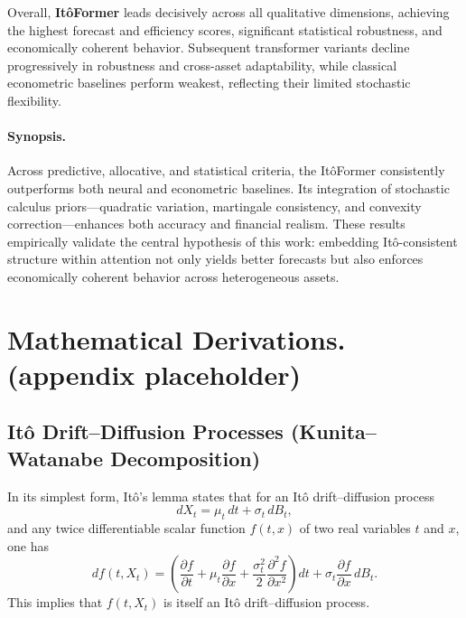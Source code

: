 \documentclass[10pt,twocolumn]{article}
\begin{document}
Overall, \textbf{ItôFormer} leads decisively across all qualitative dimensions, achieving the highest forecast and efficiency scores, significant statistical robustness, and economically coherent behavior. Subsequent transformer variants decline progressively in robustness and cross-asset adaptability, while classical econometric baselines perform weakest, reflecting their limited stochastic flexibility.

\paragraph{Synopsis.}

Across predictive, allocative, and statistical criteria, the ItôFormer consistently outperforms both neural and econometric baselines.  
Its integration of stochastic calculus priors---quadratic variation, martingale consistency, and convexity correction---enhances both accuracy and financial realism.  
These results empirically validate the central hypothesis of this work:  
embedding Itô-consistent structure within attention not only yields better forecasts but also enforces economically coherent behavior across heterogeneous assets.



















\clearpage

\section*{Mathematical Derivations. (appendix placeholder)}
\subsection*{It\^o Drift--Diffusion Processes (Kunita--Watanabe Decomposition)}

In its simplest form, It\^o's lemma states that for an It\^o drift--diffusion process
\begin{equation}
dX_t = \mu_t\,dt + \sigma_t\,dB_t,
\end{equation}
and any twice differentiable scalar function $f(t, x)$ of two real variables $t$ and $x$, one has
\begin{equation}
df(t, X_t)
= \left(
\frac{\partial f}{\partial t}
+ \mu_t \frac{\partial f}{\partial x}
+ \frac{\sigma_t^2}{2} \frac{\partial^2 f}{\partial x^2}
\right) dt
+ \sigma_t \frac{\partial f}{\partial x}\, dB_t.
\end{equation}
This implies that $f(t, X_t)$ is itself an It\^o drift--diffusion process.
\end{document}
